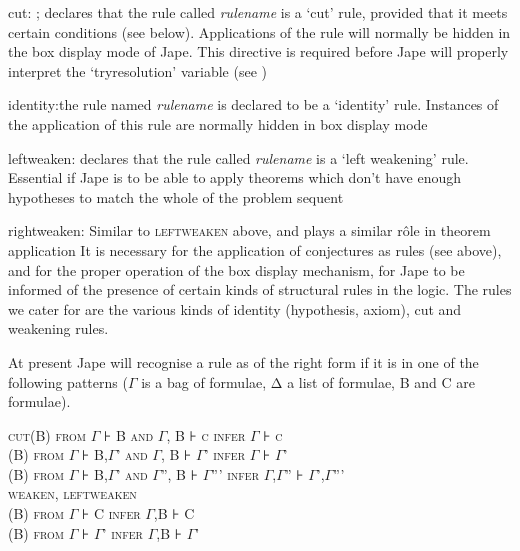 cut: ; declares that the rule called \textit{rulename} is a `cut' rule, provided that it meets certain conditions (see below). Applications of the rule will normally be hidden in the box display mode of Jape. This directive is required before Jape will properly interpret the `tryresolution' variable (see )

identity:the rule named \textit{rulename} is declared to be a `identity' rule. Instances of the application of this rule are normally hidden in box display mode

leftweaken: declares that the rule called \textit{rulename} is a `left weakening' rule. Essential if Jape is to be able to apply theorems which don't have enough hypotheses to match the whole of the problem sequent

rightweaken: Similar to \textsc{leftweaken} above, and plays a similar r\^{o}le in theorem application
It is necessary for the application of conjectures as rules (see above), and for the proper operation of the box display mechanism, for Jape to be informed of the presence of certain kinds of structural rules in the logic. The rules we cater for are the various kinds of identity (hypothesis, axiom), cut and weakening rules.


At present Jape will recognise a rule as of the right form if it is in one of the following patterns (\ensuremath{\Gamma} is a bag of formulae, Δ a list of formulae, B and C are formulae).


\textsc{cut\tab (B) from} \textsc{{\large \ensuremath{\Gamma}}} \textsc{⊦} \textsc{B and} \textsc{{\large \ensuremath{\Gamma}}}\textsc{, B} \textsc{⊦} \textsc{{\large c}} \textsc{infer} \textsc{{\large \ensuremath{\Gamma}}} \textsc{⊦} \textsc{{\large c}}\\
\textsc{(B) from} \textsc{{\large \ensuremath{\Gamma}}} \textsc{⊦} \textsc{B,}\textsc{{\large \ensuremath{\Gamma}}}\textsc{'} \textsc{and} \textsc{{\large \ensuremath{\Gamma}}}\textsc{, B} \textsc{⊦} \textsc{{\large \ensuremath{\Gamma}}}\textsc{'} \textsc{infer} \textsc{{\large \ensuremath{\Gamma}}} \textsc{⊦} \textsc{{\large \ensuremath{\Gamma}}}\textsc{'}\\
\textsc{(B) from} \textsc{{\large \ensuremath{\Gamma}}} \textsc{⊦} \textsc{B,}\textsc{{\large \ensuremath{\Gamma}}}\textsc{'} \textsc{and} \textsc{{\large \ensuremath{\Gamma}}}\textsc{''}\textsc{, B} \textsc{⊦} \textsc{{\large \ensuremath{\Gamma}}}\textsc{'''} \textsc{infer} \textsc{{\large \ensuremath{\Gamma},\ensuremath{\Gamma}}}\textsc{''} \textsc{⊦} \textsc{{\large \ensuremath{\Gamma}}}\textsc{',}\textsc{\ensuremath{\Gamma}}\textsc{'''}\\
\textsc{weaken, leftweaken\\
(B) from} \textsc{\ensuremath{\Gamma}} \textsc{⊦} \textsc{C infer} \textsc{\ensuremath{\Gamma}}\textsc{,B} \textsc{⊦} \textsc{C \\
(B) from} \textsc{\ensuremath{\Gamma}} \textsc{⊦} \textsc{\ensuremath{\Gamma}}\textsc{'} \textsc{infer} \textsc{\ensuremath{\Gamma}}\textsc{,B} \textsc{⊦} \textsc{\ensuremath{\Gamma}}\textsc{'}

